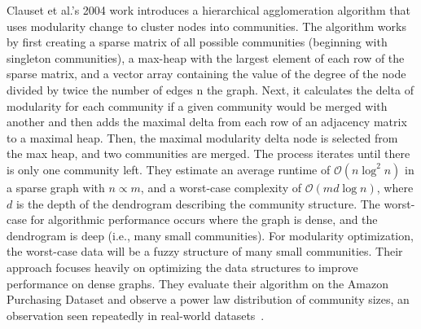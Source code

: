  \par{Clauset et al.'s 2004 work introduces a hierarchical agglomeration algorithm that uses modularity change to cluster nodes into communities. 
 The algorithm works by first creating a sparse matrix of all possible communities (beginning with singleton communities), a max-heap with the largest element of each row of the sparse matrix, and a vector array containing the value of the degree of the node divided by twice the number of edges n the graph. 
 Next, it calculates the delta of modularity for each community if a given community would be merged with another and then adds the maximal delta from each row of an adjacency matrix to a maximal heap. 
 Then, the maximal modularity delta node is selected from the max heap, and two communities are merged. 
 The process iterates until there is only one community left. 
 They estimate an average runtime of $\mathcal{O}(n\log^2{n})$ in a sparse graph with $n \propto m$, and a worst-case complexity of $\mathcal{O}(md\log{n})$, where $d$ is the depth of the dendrogram describing the community structure. 
 The worst-case for algorithmic performance occurs where the graph is dense, and the dendrogram is deep (i.e., many small communities). For modularity optimization, the worst-case data will be a fuzzy structure of many small communities. 
 Their approach focuses heavily on optimizing the data structures to improve performance on dense graphs. 
 They evaluate their algorithm on the Amazon Purchasing Dataset and observe a power law distribution of community sizes, an observation seen repeatedly in real-world datasets~\cite{Clauset2004}.}

